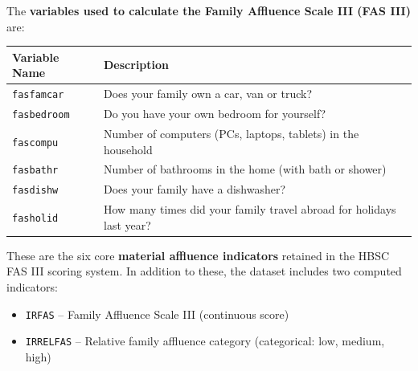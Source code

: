 \documentclass[a4paper]{article}
\begin{document}

The \textbf{variables used to calculate the Family Affluence Scale III (FAS III)} are:

\begin{longtable}{@{}ll@{}}
\toprule
\textbf{Variable Name} & \textbf{Description} \\
\midrule
\texttt{fasfamcar} & Does your family own a car, van or truck? \\
\texttt{fasbedroom} & Do you have your own bedroom for yourself? \\
\texttt{fascompu} & Number of computers (PCs, laptops, tablets) in the household \\
\texttt{fasbathr} & Number of bathrooms in the home (with bath or shower) \\
\texttt{fasdishw} & Does your family have a dishwasher? \\
\texttt{fasholid} & How many times did your family travel abroad for holidays last year? \\
\bottomrule
\end{longtable}

These are the six core \textbf{material affluence indicators} retained in the HBSC FAS III scoring system. In addition to these, the dataset includes two computed indicators:

\begin{itemize}
  \item \texttt{IRFAS} – Family Affluence Scale III (continuous score)
  \item \texttt{IRRELFAS} – Relative family affluence category (categorical: low, medium, high)
\end{itemize}
\end{document}
